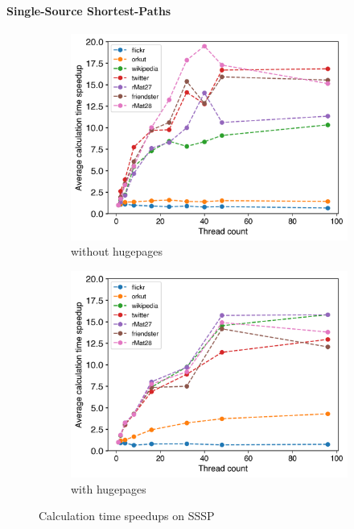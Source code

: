 \paragraph{Single-Source Shortest-Paths}
\begin{figure}
	\hfil
	\begin{subfigure}{0.4\textwidth}
		\includegraphics[width=\linewidth]{../../plots/singleNodeSSSPGaloisThreads.png}
		\caption{without hugepages}
		\label{fig:galoisSpeedupSSSP_noHP}
	\end{subfigure}
	\begin{subfigure}{0.4\textwidth}
		\includegraphics[width=\linewidth]{../../plots/singleNodeSSSPGaloisHPThreads.png}
		\caption{with hugepages}
		\label{fig:galoisSpeedupSSSP_HP}
	\end{subfigure}
	\hfil
	\caption{Calculation time speedups on SSSP}
	\label{fig:galoisSpeedupSSSP}
\end{figure}
